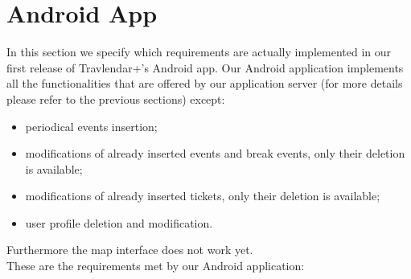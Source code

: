 \section{Android App}
\label{sec:AndroidApp}
In this section we specify which requirements are actually implemented in our first release of Travlendar+'s Android app.
Our Android application implements all the functionalities that are offered by our application server (for more details please refer to the previous sections) except: 
\begin{itemize}
	\item periodical events insertion;
	\item modifications of already inserted events and break events, only their deletion is available;
	\item modifications of already inserted tickets, only their deletion is available;
	\item user profile deletion and modification.
\end{itemize}
Furthermore the map interface does not work yet.\\
\noindent 
These are the requirements met by our Android application:

